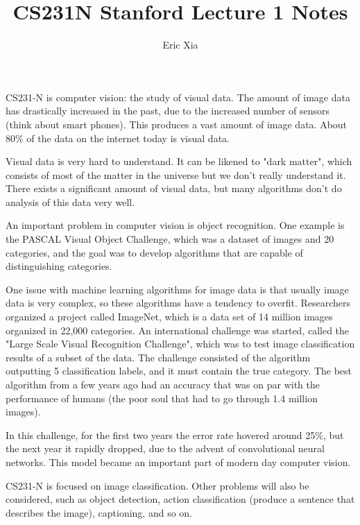 \documentclass[11pt]{article}
\title{CS231N Stanford Lecture 1 Notes}
\author{Eric Xia}
\begin{document}
\maketitle

CS231-N is computer vision: the study of visual data. The amount of image data has drastically increased in the past, due to the increased number of sensors (think about smart phones). This produces a vast amount of image data. About 80\% of the data on the internet today is visual data.

\vspace{3mm}
Visual data is very hard to understand. It can be likened to "dark matter", which consists of most of the matter in the universe but we don't really understand it. There exists a significant amount of visual data, but many algorithms don't do analysis of this data very well.

\vspace{3mm}
An important problem in computer vision is object recognition. One example is the PASCAL Visual Object Challenge, which was a dataset of images and 20 categories, and the goal was to develop algorithms that are capable of distinguishing categories.

\vspace{3mm}
One issue with machine learning algorithms for image data is that usually image data is very complex, so these algorithms have a tendency to overfit. Researchers organized a project called ImageNet, which is a data set of 14 million images organized in 22,000 categories. An international challenge was started, called the "Large Scale Visual Recognition Challenge", which was to test image classification results of a subset of the data. The challenge consisted of the algorithm outputting 5 classification labels, and it must contain the true category. The best algorithm from a few years ago had an accuracy that was on par with the performance of humans (the poor soul that had to go through 1.4 million images).

\vspace{3mm}
In this challenge, for the first two years the error rate hovered around 25\%, but the next year it rapidly dropped, due to the advent of convolutional neural networks. This model became an important part of modern day computer vision. 

\vspace{3mm}
CS231-N is focused on image classification. Other problems will also be considered, such as object detection, action classification (produce a sentence that describes the image), captioning, and so on. 
\end{document}
